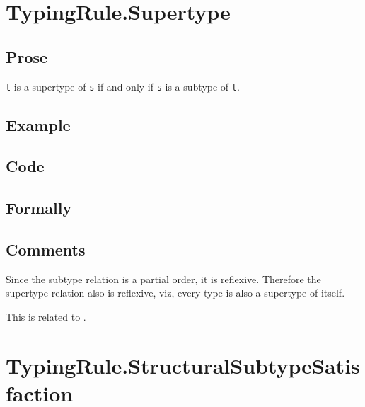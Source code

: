 \documentclass{book}
\begin{document}
\section{TypingRule.Supertype}

  \subsection{Prose}
  \texttt{t} is a supertype of \texttt{s} if and only if \texttt{s} is a subtype of \texttt{t}.


  \subsection{Example}

  \subsection{Code}

\begin{emptyformal}
  \subsection{Formally}
\end{emptyformal}

\subsection{Comments}
  Since the subtype relation is a partial order, it is reflexive. Therefore the
  supertype relation also is reflexive, viz, every type is also a supertype of
  itself.

  This is related to .

\section{TypingRule.StructuralSubtypeSatisfaction\label{sec:TypingRule.SubtypeSatisfaction}}
\end{document}
